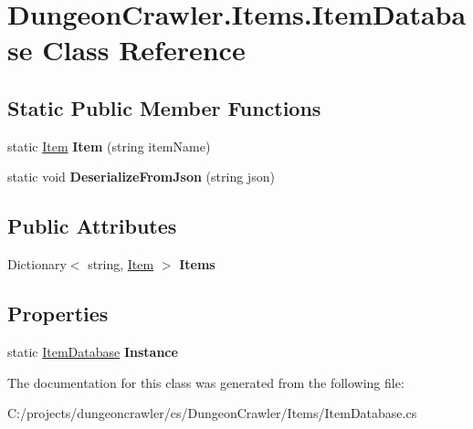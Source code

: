 \hypertarget{class_dungeon_crawler_1_1_items_1_1_item_database}{}\section{Dungeon\+Crawler.\+Items.\+Item\+Database Class Reference}
\label{class_dungeon_crawler_1_1_items_1_1_item_database}
\subsection*{Static Public Member Functions}
\begin{DoxyCompactItemize}
\item 
\hypertarget{class_dungeon_crawler_1_1_items_1_1_item_database_a33be47d7d656acd26d776afc65719b39}{}static \hyperlink{class_dungeon_crawler_1_1_items_1_1_item}{Item} {\bfseries Item} (string item\+Name)\label{class_dungeon_crawler_1_1_items_1_1_item_database_a33be47d7d656acd26d776afc65719b39}

\item 
\hypertarget{class_dungeon_crawler_1_1_items_1_1_item_database_aea405096a19341bbbd3b8d271910c308}{}static void {\bfseries Deserialize\+From\+Json} (string json)\label{class_dungeon_crawler_1_1_items_1_1_item_database_aea405096a19341bbbd3b8d271910c308}

\end{DoxyCompactItemize}
\subsection*{Public Attributes}
\begin{DoxyCompactItemize}
\item 
\hypertarget{class_dungeon_crawler_1_1_items_1_1_item_database_a6036271a68947bb8b06ea3adb27de983}{}Dictionary$<$ string, \hyperlink{class_dungeon_crawler_1_1_items_1_1_item}{Item} $>$ {\bfseries Items}\label{class_dungeon_crawler_1_1_items_1_1_item_database_a6036271a68947bb8b06ea3adb27de983}

\end{DoxyCompactItemize}
\subsection*{Properties}
\begin{DoxyCompactItemize}
\item 
\hypertarget{class_dungeon_crawler_1_1_items_1_1_item_database_a56c27f0275569e9a6e05bb819f37cfce}{}static \hyperlink{class_dungeon_crawler_1_1_items_1_1_item_database}{Item\+Database} {\bfseries Instance}\label{class_dungeon_crawler_1_1_items_1_1_item_database_a56c27f0275569e9a6e05bb819f37cfce}

\end{DoxyCompactItemize}


The documentation for this class was generated from the following file\+:\begin{DoxyCompactItemize}
\item 
C\+:/projects/dungeoncrawler/cs/\+Dungeon\+Crawler/\+Items/Item\+Database.\+cs\end{DoxyCompactItemize}
